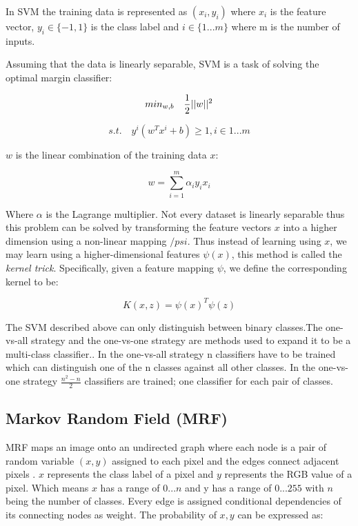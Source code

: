 In SVM the training data is represented as $(x_i,y_i)$ where $x_i$ is the feature vector, $y_i \in \{-1,1\}$ is the class label and $i \in \{1...m\}$ where m is the number of inputs.

Assuming that the data is linearly separable, SVM is a task of solving the optimal margin classifier:

\begin{equation}
    min_{w,b} \quad \frac{1}{2}||w||^2 \\
\end{equation}

\begin{equation}
    s.t. \quad y^{i}(w^T x^i +b)\geqslant 1, i \in {1...m}
\end{equation}

\vspace{0.1cm}

\noindent $w$ is the linear combination of the training data $x$:

\begin{equation}
    w = \sum_{i=1}^m \alpha_i y_i x_i
\end{equation}

\noindent Where $\alpha$ is the Lagrange multiplier. Not every dataset is linearly separable thus this problem can be solved by transforming the feature vectors $x$ into a higher dimension using a non-linear mapping $/psi$. Thus instead of learning using $x$, we may learn using a higher-dimensional features $\psi(x)$, this method is called the \textit{kernel trick}. Specifically, given a feature mapping $\psi$, we define the corresponding kernel to be:    

\begin{equation}
    K(x,z)=\psi(x)^T\psi(z)
\end{equation}

The SVM described above can only distinguish between binary classes.The one-vs-all strategy and the one-vs-one strategy are methods used to expand it to be a multi-class classifier.. In the one-vs-all strategy n classifiers have to be trained which can distinguish one of the n classes against all other classes. In the one-vs-one strategy $\frac{n^2-n}{2}$ classifiers are trained; one classifier for each pair of classes.

\subsection{Markov Random Field (MRF)} MRF maps an image onto an undirected graph where each node is a pair of random variable $(x,y)$ assigned to each pixel and the edges connect adjacent pixels \cite{YU201882}. $x$ represents the class label of a pixel and $y$ represents the RGB value of a pixel. Which means $x$ has a range of ${0...n}$ and y has a range of ${0...255}$ with $n$ being the number of classes.  Every edge is assigned conditional dependencies of its connecting nodes as weight. The probability of $x,y$ can be expressed as:


